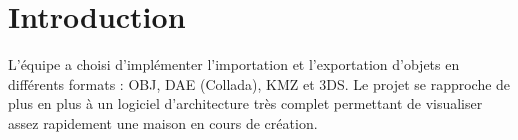 \section{Introduction}

L'équipe a choisi d'implémenter l'importation et l'exportation d'objets en différents formats : OBJ, DAE (Collada), KMZ et 3DS. Le projet se rapproche de plus en plus à un logiciel d'architecture très complet permettant de visualiser assez rapidement une maison en cours de création.